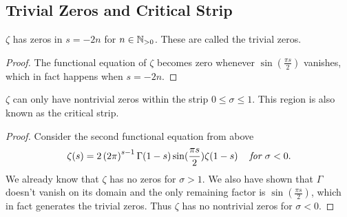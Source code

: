 \subsection{Trivial Zeros and Critical Strip}


\begin{corollary}
	$\zeta$ has zeros in $s = -2n$ for $n \in \mathbb{N}_{> 0}$. These are called the trivial zeros.
\end{corollary}
\begin{proof}
	The functional equation of $\zeta$ becomes zero whenever $\sin(\frac{\pi s}{2})$ vanishes, which in fact happens when $s = -2n$.
\end{proof}


\begin{corollary}
	$\zeta$ can only have nontrivial zeros within the strip $0 \leq \sigma \leq 1$. This region is also known as the critical strip.
\end{corollary}
\begin{proof}
	Consider the second functional equation from above
\begin{equation*}
	\zeta(s) = 2\left(2 \pi\right)^{s-1} \Gamma(1 - s) \sin(\frac{\pi s}{2}) \zeta(1 - s) \hspace{0.3cm} \textit{ for } \sigma < 0. 
\end{equation*}
	We already know that $\zeta$ has no zeros for $\sigma > 1$. We also have shown that $\Gamma$ doesn't vanish on its domain and the only remaining factor is $\sin(\frac{\pi s}{2})$, which in fact generates the trivial zeros. Thus $\zeta$ has no nontrivial zeros for $\sigma < 0$.
\end{proof}